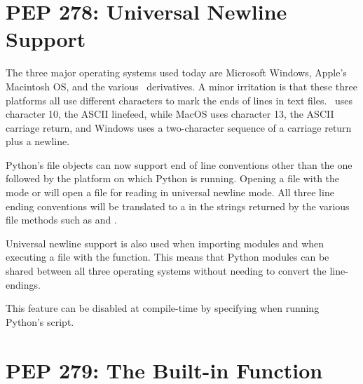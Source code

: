 \documentclass{howto}
\begin{document}
\begin{seealso}


\end{seealso}


\section{PEP 278: Universal Newline Support}

The three major operating systems used today are Microsoft Windows,
Apple's Macintosh OS, and the various \UNIX\ derivatives.  A minor
irritation is that these three platforms all use different characters
to mark the ends of lines in text files.  \UNIX\ uses character 10,
the ASCII linefeed, while MacOS uses character 13, the ASCII carriage
return, and Windows uses a two-character sequence of a carriage return
plus a newline.

Python's file objects can now support end of line conventions other
than the one followed by the platform on which Python is running.
Opening a file with the mode  or  will open a file
for reading in universal newline mode.  All three line ending
conventions will be translated to a  in the strings
returned by the various file methods such as  and
. 

Universal newline support is also used when importing modules and when
executing a file with the  function.  This means
that Python modules can be shared between all three operating systems
without needing to convert the line-endings.

This feature can be disabled at compile-time by specifying 
 when running Python's
 script.

\begin{seealso}


\end{seealso}


\section{PEP 279: The  Built-in Function\label{section-enumerate}}
\end{document}
